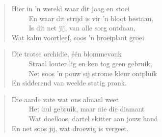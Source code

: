 \begin{verse}
Hier in ’n wereld waar dit jaag en stoei \\ 
\ \ \ \ \ En waar dit strijd is vir ’n bloot bestaan, \\ 
\ \ \ \ \ Is dit net jij, van alle sorg ontdaan, \\ 
Wat kalm voortleef, soos ’n broeiplant groei. \\ 
\end{verse}

\begin{verse}
Die trotse orchidie, één blommevonk \\ 
\ \ \ \ \ Straal louter lig en ken tog geen gebruik, \\ 
\ \ \ \ \ Net soos ’n pouw sij strome kleur ontpluik \\ 
En sidderend van weelde statig pronk. \\ 
\end{verse}

\begin{verse}
Die aarde vate wat ons almaal weet \\ 
\ \ \ \ \ Het hul gebruik, maar nie die diamant \\ 
\ \ \ \ \ Wat doelloos, dartel skitter aan jouw hand \\ 
En net soos jij, wat droewig is vergeet. \\ 
\end{verse}